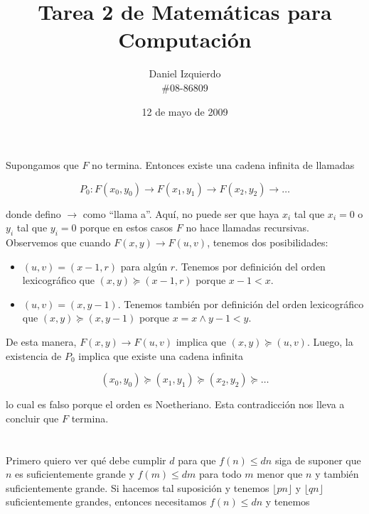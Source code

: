 \documentclass{article}
\newcommand{\piso}[1]{\lfloor #1 \rfloor}
\begin{document}

\title{Tarea 2 de Matemáticas para Computación}
\author{Daniel Izquierdo \\ \#08-86809}
\date{12 de mayo de 2009}

\maketitle

\section{}

Supongamos que $F$ no termina. Entonces existe una cadena
infinita de llamadas

$$
P_0: F(x_0, y_0) \rightarrow F(x_1, y_1) \rightarrow F(x_2, y_2) \rightarrow \ldots
$$

donde defino $\rightarrow$ como ``llama a''.
Aquí, no puede ser que haya $x_i$ tal que $x_i = 0$ o $y_i$ tal que $y_i = 0$
porque
en estos casos $F$ no hace llamadas recursivas.
Observemos que cuando
$F(x,y) \rightarrow F(u,v)$, tenemos dos posibilidades:

\begin{itemize}
\item $(u,v) = (x-1,r)$ para algún $r$. Tenemos por definición del orden
lexicográfico que $(x,y) \succeq (x-1,r)$ porque $x-1 < x$.
\item $(u,v) = (x,y-1)$. Tenemos también por definición del orden lexicográfico
que $(x,y) \succeq (x,y-1)$ porque $x = x \wedge y-1 < y$.
\end{itemize}

De esta manera, $F(x,y) \rightarrow F(u,v)$ implica que $(x,y) \succeq (u,v)$.
Luego, la existencia de $P_0$ implica que existe una cadena infinita

$$
(x_0, y_0) \succeq (x_1, y_1) \succeq (x_2, y_2) \succeq \ldots
$$

lo cual es falso porque el orden es Noetheriano. Esta contradicción nos lleva a
concluir que $F$ termina.

\section{}

Primero quiero ver qué debe cumplir $d$ para que $f(n) \leq dn$ siga de suponer
que $n$ es suficientemente grande y $f(m) \leq dm$ para todo $m$ menor que $n$
y también suficientemente grande. Si hacemos tal suposición y tenemos
$\piso{pn}$ y $\piso{qn}$ suficientemente grandes, entonces necesitamos
$f(n) \leq dn$ y tenemos
\end{document}
